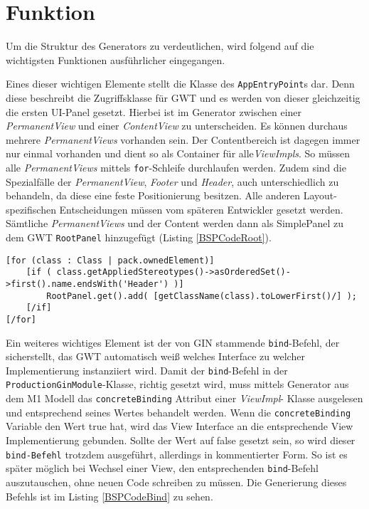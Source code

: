 \section{Funktion}\label{Funktion}
Um die Struktur des Generators zu verdeutlichen, wird folgend auf die wichtigsten Funktionen ausführlicher eingegangen.

Eines dieser wichtigen Elemente stellt die Klasse des \texttt{AppEntryPoint}s dar. Denn diese beschreibt die Zugriffsklasse für GWT und es werden von dieser gleichzeitig die ersten UI-Panel gesetzt. Hierbei ist im Generator zwischen einer \textit{PermanentView} und einer \textit{ContentView} zu unterscheiden. Es können durchaus mehrere \textit{PermanentViews} vorhanden sein. Der Contentbereich ist dagegen immer nur einmal vorhanden und dient so als Container für alle\textit{ViewImpls}. So müssen alle \textit{PermanentViews} mittels \texttt{for}-Schleife durchlaufen werden. Zudem sind die Spezialfälle der \textit{PermanentView}, \textit{Footer} und \textit{Header}, auch unterschiedlich zu behandeln, da diese eine feste Positionierung besitzen. Alle anderen Layout-spezifischen Entscheidungen müssen vom späteren Entwickler gesetzt werden. Sämtliche \textit{PermanentViews} und der Content werden dann als SimplePanel zu dem GWT \texttt{RootPanel} hinzugefügt (Listing \ref{BSPCodeRoot}). \\
\lstset{language=OCL}\label{BSPCodeRoot}
\begin{lstlisting}[caption={Hinzufügen eines Panels zum RootPanel, am Beipsiel eines Header}]
[for (class : Class | pack.ownedElement)]
	[if ( class.getAppliedStereotypes()->asOrderedSet()->first().name.endsWith('Header') )]
		RootPanel.get().add( [getClassName(class).toLowerFirst()/] );
	[/if]
[/for]
\end{lstlisting}
Ein weiteres wichtiges Element ist der von GIN stammende \texttt{bind}-Befehl, der sicherstellt, das GWT automatisch weiß welches Interface zu welcher Implementierung instanziiert wird.
Damit der \texttt{bind}-Befehl in der \texttt{ProductionGinModule}-Klasse, richtig gesetzt wird, muss mittels Generator aus dem M1 Modell das \texttt{concreteBinding} Attribut einer \textit{ViewImpl}- Klasse ausgelesen und entsprechend seines Wertes behandelt werden. Wenn die \texttt{concreteBinding} Variable den Wert true hat, wird das View Interface an die entsprechende View Implementierung gebunden. Sollte der Wert auf false gesetzt sein, so wird dieser \texttt{bind-Befehl} trotzdem ausgeführt, allerdings in kommentierter Form. So ist es später möglich bei Wechsel einer View, den entsprechenden \texttt{bind}-Befehl auszutauschen, ohne neuen Code schreiben zu müssen. Die Generierung dieses Befehls ist im Listing \ref{BSPCodeBind} zu sehen.
